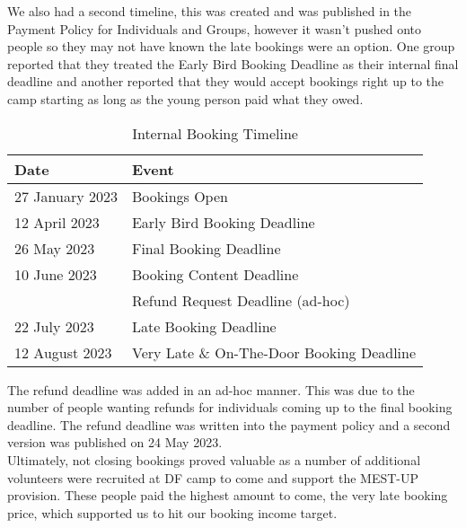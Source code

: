 We also had a second timeline, this was created and was published in the Payment Policy for Individuals and Groups, however it wasn't pushed onto people so they may not have known the late bookings were an option. One group reported that they treated the Early Bird Booking Deadline as their internal final deadline and another reported that they would accept bookings right up to the camp starting as long as the young person paid what they owed. 
\begin{table}[h]
    \centering
    {\RaggedRight
    \begin{tabular}{p{} p{}}
    \textbf{Date} & \textbf{Event}\\
    \hline
    \hline
    27 January 2023 & Bookings Open\\
    \hline
    12 April 2023 & Early Bird Booking Deadline\\
    \hline
    26 May 2023 & Final Booking Deadline\\
    \hline
    10 June 2023 & Booking Content Deadline\\
    & Refund Request Deadline (ad-hoc)\\
    \hline
    22 July 2023 & Late Booking Deadline\\
    \hline
    12 August 2023 & Very Late \& On-The-Door Booking Deadline\\
    \hline
    \end{tabular}
    } %
    \caption{Internal Booking Timeline}
    \label{tab:booking-internal-timeline}
\end{table}

The refund deadline was added in an ad-hoc manner. This was due to the number of people wanting refunds for individuals coming up to the final booking deadline. The refund deadline was written into the payment policy and a second version was published on 24 May 2023.\\

Ultimately, not closing bookings proved valuable as a number of additional volunteers were recruited at DF camp to come and support the MEST-UP provision. These people paid the highest amount to come, the very late booking price, which supported us to hit our booking income target.
